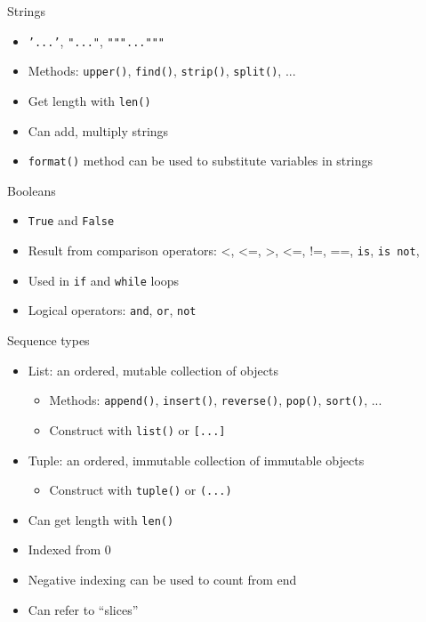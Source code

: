 \documentclass[noamssymb,svgnames]{beamer}
\newcommand{\obj}[1]{\texttt{\color{darkblue}#1}}
\begin{document}
\begin{frame}{Strings}
  \begin{itemize}
  \item \obj{'...'}, \obj{"..."}, \obj{"""..."""}
  \item Methods: \obj{upper()}, \obj{find()}, \obj{strip()},
    \obj{split()}, ...
  \item Get length with \obj{len()}
  \item Can add, multiply strings
  \item \obj{format()} method can be used to substitute variables in strings
  \end{itemize}
\end{frame}

\begin{frame}{Booleans}
  \begin{itemize}
  \item \obj{True} and \obj{False}
  \item Result from comparison operators: <, <=, >, <=, !=, ==, \obj{is},
    \obj{is not},
  \item Used in \obj{if} and \obj{while} loops
  \item Logical operators: \obj{and}, \obj{or}, \obj{not}
  \end{itemize}
\end{frame}

\begin{frame}{Sequence types}
  \begin{itemize}
  \item List: an ordered, mutable collection of objects
    \begin{itemize}
    \item Methods: \obj{append()}, \obj{insert()}, \obj{reverse()},
      \obj{pop()}, \obj{sort()}, ...
    \item Construct with \obj{list()} or \obj{[...]}
    \end{itemize}
  \item Tuple: an ordered, immutable collection of immutable objects
    \begin{itemize}
    \item Construct with \obj{tuple()} or \obj{(...)}
    \end{itemize}
  \item Can get length with \obj{len()}
  \item Indexed from 0
  \item Negative indexing can be used to count from end
  \item Can refer to ``slices''
  \end{itemize}
\end{frame}
\end{document}
